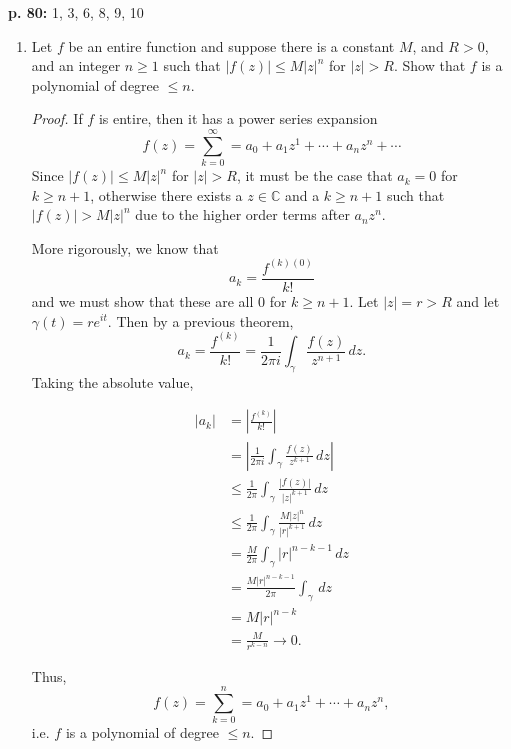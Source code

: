 \documentclass[11pt,oneside,english]{amsart}
\theoremstyle{definition}
\newcommand{\lspace}{\vspace{5mm}}
\newcommand{\MB}[1]{\mathbb{#1}}
\begin{document}
\rightline{\today}

\lspace



\textbf{p. 80:} 1, 3, 6, 8, 9, 10


\begin{enumerate}[leftmargin=*]
\itemsep5mm


\item Let $f$ be an entire function and suppose there is a constant $M$, and $R>0$, and an integer $n\geq 1$ such that $|f(z)|\leq M|z|^n$ for $|z|>R$. Show that $f$ is a polynomial of degree $\leq n$.

\begin{proof}
If $f$ is entire, then it has a power series expansion
\[
f(z)=\sum_{k=0}^\infty=a_0+a_1z^1+\cdots+a_nz^n+\cdots
\]
Since $|f(z)|\leq M|z|^n$ for $|z|>R$, it must be the case that $a_k=0$ for $k\geq n+1$, otherwise there exists a $z\in \MB{C}$ and a $k\geq n+1$ such that $|f(z)|>M|z|^n$ due to the higher order terms after $a_nz^n$. 

More rigorously, we know that
\[
a_k=\frac{f^{(k)(0)}}{k!}
\]
and we must show that these are all 0 for $k\geq n+1$. Let $|z|=r>R$ and let $\gamma(t)=re^{it}$. Then by a previous theorem, 
\[
a_k=\frac{f^{(k)}}{k!}=\frac{1}{2\pi i}\int_\gamma\frac{f(z)}{z^{n+1}}\,dz.
\]
Taking the absolute value,

\begin{align*}
|a_k|&=\left|\frac{f^{(k)}}{k!}\right|\\[2mm]
&=\left|\frac{1}{2\pi i}\int_\gamma\frac{f(z)}{z^{k+1}}\,dz\right|\\[2mm]
&\leq\frac{1}{2\pi}\int_\gamma\frac{|f(z)|}{|z|^{k+1}}\,dz\\[2mm]
&\leq\frac{1}{2\pi}\int_\gamma\frac{M|z|^n}{|r|^{k+1}}\,dz\\[2mm]
&=\frac{M}{2\pi}\int_\gamma |r|^{n-k-1}\,dz\\[2mm]
&=\frac{M|r|^{n-k-1}}{2\pi}\int_\gamma \,dz\\[2mm]
&=M|r|^{n-k}\\[2mm]
&=\frac{M}{r^{k-n}}\to0.
\end{align*}



Thus,
\[
f(z)=\sum_{k=0}^n=a_0+a_1z^1+\cdots+a_nz^n,
\]
i.e. $f$ is a polynomial of degree $\leq n$.
\end{proof}

\setcounter{enumi}{2}


\end{enumerate}
\end{document}
